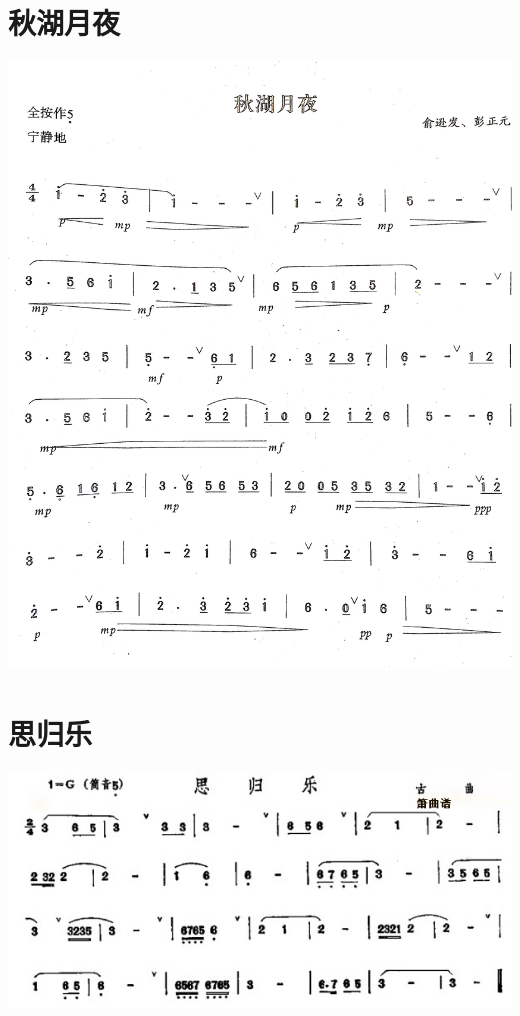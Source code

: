 \documentclass[cn,pad,chinese,chinesefont=nofont]{elegantbook}
\begin{document}
\section{秋湖月夜}   
	\includegraphics[width=\textwidth]{dongxiao/IMG_0948.jpg}
\section{思归乐}
	\includegraphics[width=\textwidth]{dongxiao/思归乐.jpg}
\end{document}
